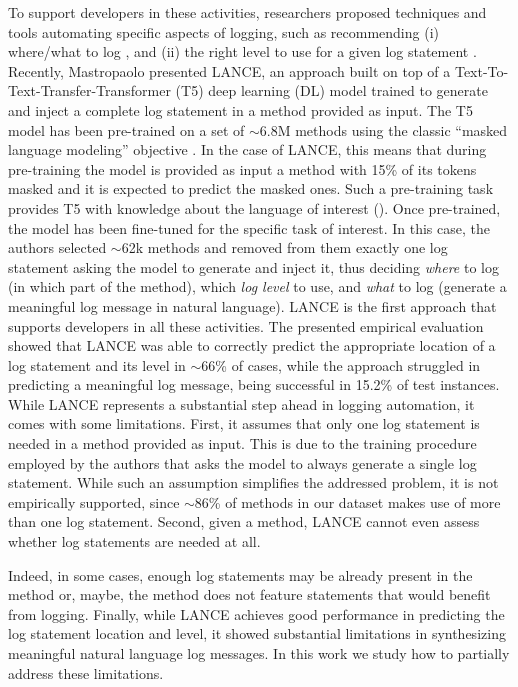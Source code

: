 To support developers in these activities, researchers proposed techniques and tools automating specific aspects of logging, such as recommending (i) where/what to log \cite{yuan2010sherlog,jia2018smartlog,li2018studying,harty2021logging,li2020shall}, and (ii) the right level to use for a given log statement \cite{yuan2012characterizing,oliner2012advances,li2017log,li2020qualitative,li2021deeplv}. Recently, Mastropaolo \etal \cite{mastropaolo2022using} presented LANCE, an approach built on top of a Text-To-Text-Transfer-Transformer (T5) deep learning (DL) model \cite{raffel2019exploring} trained to generate and inject a complete log statement in a \java method provided as input. The T5 model has been pre-trained on a set of $\sim$6.8M \java methods using the classic ``masked language modeling'' objective \cite{raffel2019exploring}. In the case of LANCE, this means that during pre-training the model is provided as input a \java method with 15\% of its tokens masked and it is expected to predict the masked ones. Such a pre-training task provides T5 with knowledge about the language of interest (\ie \java). Once pre-trained, the model has been fine-tuned for the specific task of interest. In this case, the authors selected $\sim$62k \java methods and removed from them exactly one log statement asking the model to generate and inject it, thus deciding \emph{where} to log (\ie in which part of the method), which \emph{log level} to use, and \emph{what} to log (\ie generate a meaningful log message in natural language). LANCE is the first approach that supports developers in all these activities. The presented empirical evaluation showed that LANCE was able to correctly predict the appropriate location of a log statement and its level in $\sim$66\% of cases, while the approach struggled in predicting a meaningful log message, being successful in 15.2\% of test instances. While LANCE represents a substantial step ahead in logging automation, it comes with some limitations. First, it assumes that only one log statement is needed in a \java method provided as input. This is due to the training procedure employed by the authors that asks the model to always generate a single log statement. While such an assumption simplifies the addressed problem, it is not empirically supported, since $\sim$86\% of \java methods in our dataset makes use of more than one log statement. Second, given a \java method, LANCE cannot even assess whether log statements are needed at all. 

\eject

Indeed, in some cases, enough log statements may be already present in the method or, maybe, the method does not feature statements that would benefit from logging. Finally,  while LANCE achieves good performance in predicting the log statement location and level, it showed substantial limitations in synthesizing meaningful natural language log messages. In this work we study how to partially address these limitations.

